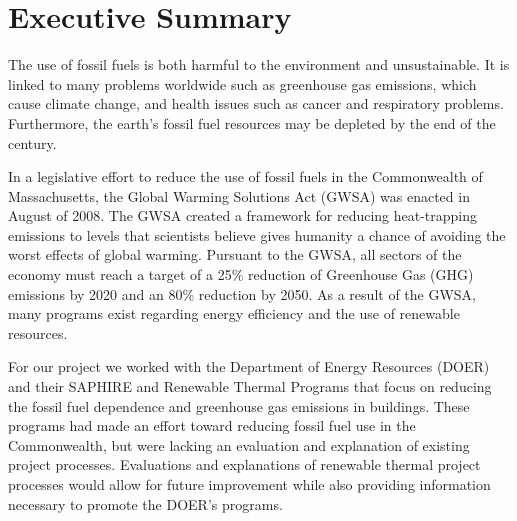 \chapter*{Executive Summary}

\par The use of fossil fuels is both harmful to the environment and unsustainable. It is linked to many problems worldwide such as greenhouse gas emissions, which cause climate change, and health issues such as cancer and respiratory problems. Furthermore, the earth's fossil fuel resources may be depleted by the end of the century.
\par In a legislative effort to reduce the use of fossil fuels in the Commonwealth of Massachusetts, the Global Warming Solutions Act (GWSA) was enacted in August of 2008. The GWSA created a framework for reducing heat-trapping emissions to levels that scientists believe gives humanity a chance of avoiding the worst effects of global warming. Pursuant to the GWSA, all sectors of the economy must reach a target of a 25\% reduction of Greenhouse Gas (GHG) emissions by 2020 and an 80\% reduction by 2050. As a result of the GWSA, many programs exist regarding energy efficiency and the use of renewable resources.
\par For our project we worked with the Department of Energy Resources (DOER) and their SAPHIRE and Renewable Thermal Programs that focus on reducing the fossil fuel dependence and greenhouse gas emissions in buildings. These programs had made an effort toward reducing fossil fuel use in the Commonwealth, but were lacking an evaluation and explanation of existing project processes. Evaluations and explanations of renewable thermal project processes would allow for future improvement while also providing information necessary to promote the DOER’s programs. 

